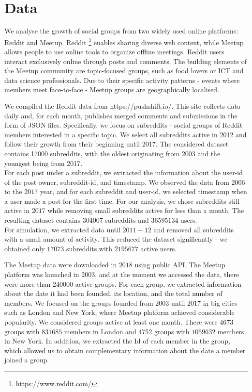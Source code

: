 \section{Data \label{sec:data}}
We analyse the growth of social groups from two widely used online platforms: Reddit and Meetup. Reddit \footnote{https://www.reddit.com/} enables sharing diverse web content, while Meetup \cite{www.meetup.com} allows people to use online tools to organize offline meetings. Reddit users interact exclusively online through posts and comments. The building elements of the Meetup community are topic-focused groups, such as food lovers or ICT and data science professionals. Due to their specific activity patterns - events where members meet face-to-face - Meetup groups are geographically localised. 

We compiled the Reddit data from https://pushshift.io/. This site collects data daily and, for each month, publishes merged comments and submissions in the form of JSON files. 
Specifically, we focus on subreddits - social groups of Reddit members interested in a specific topic. We select all subreddits active in 2012 and follow their growth from their beginning until 2017. The considered dataset contains 17000 subreddits, with the oldest originating from 2003 and the youngest being from 2017.\\
For each post under a subreddit, we extracted the information about the user-id of the post owner, subreddit-id, and timestamp. We observed the data from $2006$ to the $2017$ year, and for each subreddit and user-id, we selected timestamp when a user made a post for the first time. For our analysis, we chose subreddits still active in $2017$ while removing small subreddits active for less than a month. The resulting dataset contains $304 007$ subreddits and  $36 595 134$ users. \\
For simulation, we extracted data until $2011-12$ and removed all subreddits with a small amount of activity. This reduced the dataset significantly - we obtained only $17 073$ subreddits with $2 195 677$ active users. 

The Meetup data were downloaded in $2018$ using public API. The Meetup platform was launched in 2003, and at the moment we accessed the data, there were more than 240000 active groups. For each group, we extracted information about the date it had been founded, its location, and the total number of members. We focused on the groups founded from $2003$ until $2017$ in big cities such as London and New York, where Meetup platform achieved considerable popularity. We considered groups active at least one month. There were 4673 groups with $831685$ members in London and 4752 groups with $1059632$ members in New York. In addition, we extracted the Id of each member in the group, which allowed us to obtain complementary information about the date a member joined a group. 

